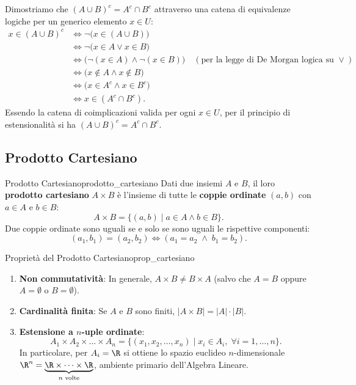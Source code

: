 \begin{dimostrazione}
Dimostriamo che $(A \cup B)^c = A^c \cap B^c$ attraverso una catena di equivalenze logiche per un generico elemento $x \in U$:
\begin{align*}
    x \in (A \cup B)^c &\iff \neg \big(x \in (A \cup B)\big) \\
    &\iff \neg \big(x \in A \lor x \in B\big) \\
    &\iff \big(\neg(x \in A) \land \neg(x \in B)\big) \quad (\text{per la legge di De Morgan logica su } \lor) \\
    &\iff \big(x \notin A \land x \notin B\big) \\
    &\iff \big(x \in A^c \land x \in B^c\big) \\
    &\iff x \in (A^c \cap B^c).
\end{align*}
Essendo la catena di coimplicazioni valida per ogni $x \in U$, per il principio di estensionalità si ha $(A \cup B)^c = A^c \cap B^c$.
\end{dimostrazione}

\subsection{Prodotto Cartesiano}

\begin{definizione}{Prodotto Cartesiano}{prodotto_cartesiano}
Dati due insiemi $A$ e $B$, il loro \textbf{prodotto cartesiano} $A \times B$ è l'insieme di tutte le \textbf{coppie ordinate} $(a, b)$ con $a \in A$ e $b \in B$:
\begin{equation}
    A \times B = \{(a, b) \mid a \in A \land b \in B\}.
\end{equation}
Due coppie ordinate sono uguali se e solo se sono uguali le rispettive componenti:
\begin{equation}
    (a_1, b_1) = (a_2, b_2) \iff (a_1 = a_2 \;\land\; b_1 = b_2).
\end{equation}
\end{definizione}

\begin{proposizione}{Proprietà del Prodotto Cartesiano}{prop_cartesiano}
\begin{enumerate}
    \item \textbf{Non commutatività}: In generale, $A \times B \neq B \times A$ (salvo che $A = B$ oppure $A = \emptyset$ o $B = \emptyset$).
    \item \textbf{Cardinalità finita}: Se $A$ e $B$ sono finiti, $|A \times B| = |A| \cdot |B|$.
    \item \textbf{Estensione a $n$-uple ordinate}:
    \begin{equation}
        A_1 \times A_2 \times \dots \times A_n = \{(x_1, x_2, \dots, x_n) \mid x_i \in A_i, \; \forall i = 1, \dots, n\}.
    \end{equation}
    In particolare, per $A_i = \R$ si ottiene lo spazio euclideo $n$-dimensionale $\R^n = \underbrace{\R \times \dots \times \R}_{n \text{ volte}}$, ambiente primario dell'Algebra Lineare.
\end{enumerate}
\end{proposizione}

